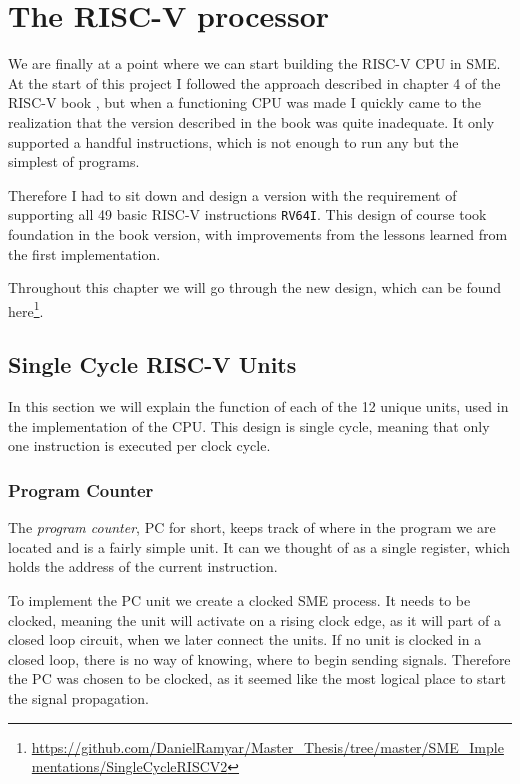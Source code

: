 \chapter{The RISC-V processor}\label{Chapter:5}
    We are finally at a point where we can start building the RISC-V CPU in SME. At the start of this project I followed the approach described in chapter 4 of the RISC-V book \cite{riscVbook}, but when a functioning CPU was made I quickly came to the realization that the version described in the book was quite inadequate. It only supported a handful instructions, which is not enough to run any but the simplest of programs. 
    
    Therefore I had to sit down and design a version with the requirement of supporting all 49 basic RISC-V instructions \texttt{RV64I}. This design of course took foundation in the book version, with improvements from the lessons learned from the first implementation.
    
    Throughout this chapter we will go through the new design, which can be found here\footnote{\url{https://github.com/DanielRamyar/Master_Thesis/tree/master/SME_Implementations/SingleCycleRISCV2}}.

\section{Single Cycle RISC-V Units}\label{section:riscunits}
    In this section we will explain the function of each of the 12 unique units, used in the implementation of the CPU. This design is single cycle, meaning that only one instruction is executed per clock cycle. 

    \subsection{Program Counter}
        The \textit{program counter}, PC for short, keeps track of where in the program we are located and is a fairly simple unit. It can we thought of as a single register, which holds the address of the current instruction.
        
        To implement the PC unit we create a clocked SME process. It needs to be clocked, meaning the unit will activate on a rising clock edge, as it will part of a closed loop circuit, when we later connect the units. If no unit is clocked in a closed loop, there is no way of knowing, where to begin sending signals. Therefore the PC was chosen to be clocked, as it seemed like the most logical place to start the signal propagation.
        
